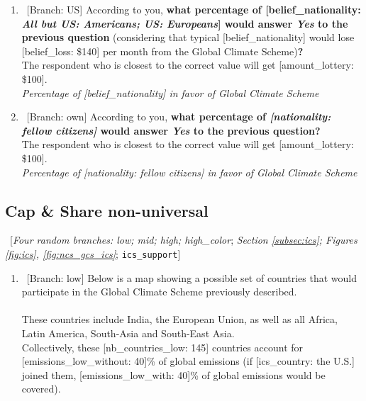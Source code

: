 \documentclass[12pt,english]{article}
\begin{document}
\begin{bibunit}
\begin{enumerate}[resume]
~\\\textbf{
Do you support the Global Climate Scheme?
} [\textit{Section \ref{subsec:ics}; Figures \ref{fig:ics}, \ref{fig:warm_glow_substitute}, \ref{fig:ncs_gcs_ics}}; 
\verb|gcs_support|]
  \\ \textit{Yes; No}\\\\
~[new page] [\textit{Two random branches: own; US}; \textit{Figure \ref{fig:ncs_gcs_ics}}; \verb|gcs_belief, variant_belief|] 
\item ~[Branch: US] \label{q:gcs_belief_us} According to you, \textbf{what percentage of [belief\_nationality: \textit{All but US: Americans; US: Europeans}] would answer \textit{Yes }to the previous question} (considering that typical [belief\_nationality] would lose [belief\_loss: \$140] per month from the Global Climate Scheme)\textbf{?}\\ The respondent who is closest to the correct value will get [amount\_lottery: \$100]. %
  \\ \textit{Percentage of [belief\_nationality] in favor of Global Climate Scheme}

\item ~[Branch: own] \label{q:gcs_belief_own} According to you, \textbf{what percentage of \textit{[nationality: fellow citizens]} would answer \textit{Yes }to the previous question?}\\ The respondent who is closest to the correct value will get [amount\_lottery: \$100]. %
  \\ \textit{Percentage of [nationality: fellow citizens] in favor of Global Climate Scheme}

\end{enumerate} 

 \subsection*{Cap \& Share non-universal} 
 ~[\textit{Four random branches: low; mid; high; high\_color}; \textit{Section \ref{subsec:ics}; Figures \ref{fig:ics}, \ref{fig:ncs_gcs_ics}}; 
 \verb|ics_support|] 
 \begin{enumerate}[resume] 
\item ~[Branch: low]  \label{q:gcs_low} Below is a map showing a possible set of countries that would participate in the Global Climate Scheme previously described.\\
~\\
These countries include India, the European Union, as well as all Africa, Latin America, South-Asia and South-East Asia.\\
Collectively, these [nb\_countries\_low: 145] countries account for [emissions\_low\_without: 40]\% of global emissions (if [ics\_country: the U.S.] joined them, [emissions\_low\_with: 40]\% of global emissions would be covered).\\
~\\ 


\end{enumerate}
\end{bibunit}
\end{document}
